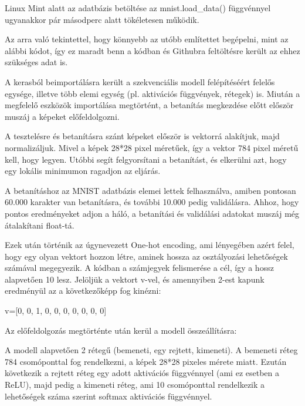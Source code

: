 \documentclass[hidelinks,12pt,a4paper]{report}
\begin{document}
Linux Mint alatt az adatbázis betöltése az mnist.load\_data() függvénnyel ugyanakkor pár másodperc alatt tökéletesen működik.

Az arra való tekintettel, hogy könnyebb az utóbb említettet begépelni, mint az alábbi kódot, így ez maradt benn a kódban és Githubra feltöltésre került az ehhez szükséges adat is.




A kerasból beimportálásra került a szekvenciális modell felépítéséért felelős egysége, illetve több elemi egység (pl. aktivációs függvények, rétegek) is.
Miután a megfelelő eszközök importálása megtörtént, a betanítás megkezdése előtt először muszáj a képeket előfeldolgozni.

A tesztelésre és betanításra szánt képeket először is vektorrá alakítjuk, majd normalizáljuk.
Mivel a képek 28*28 pixel méretűek, így a vektor 784 pixel méretű kell, hogy legyen.
Utóbbi segít felgyorsítani a betanítást, és elkerülni azt, hogy egy lokális minimumon ragadjon az eljárás.

A betanításhoz az MNIST adatbázis elemei lettek felhasználva, amiben pontosan 60.000 karakter van betanításra, és további 10.000 pedig validálásra.
Ahhoz, hogy pontos eredményeket adjon a háló, a betanítási és validálási adatokat muszáj még átalakítani float-tá.


Ezek után történik az úgynevezett One-hot encoding, ami lényegében azért felel, hogy egy olyan vektort hozzon létre, aminek hossza az osztályozási lehetőségek számával megegyezik.
A kódban a számjegyek felismerése a cél, így a hossz alapvetően 10 lesz.
Jelöljük a vektort v-vel, és amennyiben 2-est kapunk eredményül az a következőképp fog kinézni:

v=[0, 0, 1, 0, 0, 0, 0, 0, 0, 0]


Az előfeldolgozás megtörténte után kerül a modell összeállításra:


A modell alapvetően 2 rétegű (bemeneti, egy rejtett, kimeneti). A bemeneti réteg 784 csomóponttal fog rendelkezni, a képek 28*28 pixeles mérete miatt. Ezután következik a rejtett réteg egy adott aktivációs függvénnyel (ami ez esetben a ReLU), majd pedig a kimeneti réteg, ami 10 csomóponttal rendelkezik a lehetőségek száma szerint softmax aktivációs függvénnyel.
\end{document}
